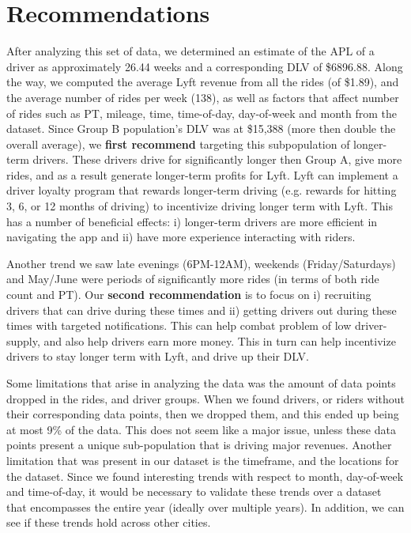 \documentclass{report}
\begin{document}
\section{Recommendations}
	
	After analyzing this set of data, we determined an estimate of the APL of a driver as approximately 26.44 weeks and a corresponding DLV of \$6896.88. Along the way, we computed the average Lyft revenue from all the rides (of \$1.89), and the average number of rides per week (138), as well as factors that affect number of rides such as PT, mileage, time, time-of-day, day-of-week and month from the dataset. Since Group B population's DLV was at \$15,388 (more then double the overall average), we \textbf{first recommend} targeting this subpopulation of longer-term drivers. These drivers drive for significantly longer then Group A, give more rides, and as a result generate longer-term profits for Lyft. Lyft can implement a driver loyalty program that rewards longer-term driving (e.g. rewards for hitting 3, 6, or 12 months of driving) to incentivize driving longer term with Lyft. This has a number of beneficial effects: i) longer-term drivers are more efficient in navigating the app and ii) have more experience interacting with riders. 

	Another trend we saw late evenings (6PM-12AM), weekends (Friday/Saturdays) and May/June were periods of significantly more rides (in terms of both ride count and PT). Our \textbf{second recommendation} is to focus on i) recruiting drivers that can drive during these times and ii) getting drivers out during these times with targeted notifications. This can help combat problem of low driver-supply, and also help drivers earn more money. This in turn can help incentivize drivers to stay longer term with Lyft, and drive up their DLV.

	Some limitations that arise in analyzing the data was the amount of data points dropped in the rides, and driver groups. When we found drivers, or riders without their corresponding data points, then we dropped them, and this ended up being at most 9\% of the data. This does not seem like a major issue, unless these data points present a unique sub-population that is driving major revenues. Another limitation that was present in our dataset is the timeframe, and the locations for the dataset. Since we found interesting trends with respect to month, day-of-week and time-of-day, it would be necessary to validate these trends over a dataset that encompasses the entire year (ideally over multiple years). In addition, we can see if these trends hold across other cities.
\end{document}
